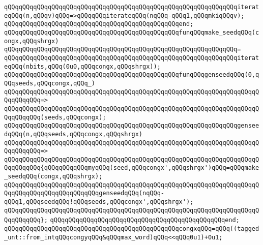 \verb|qQQqqQQqqQQqqQQqqQQqqQQqqQQqqQQqqQQqqQQqqQQqqQQqqQQqqQQqqQQqqQQqiterateqQQq(n,qQQqv)qQQq=>qQQqqQQqiterateqQQq(nqQQq-qQQq1,qQQqmkiqQQqv);|\newline
\verb|qQQqqQQqqQQqqQQqqQQqqQQqqQQqqQQqqQQqqQQqqQQqqQQqend;|\newline
\newline
\verb|qQQqqQQqqQQqqQQqqQQqqQQqqQQqqQQqqQQqqQQqqQQqqQQqfunqQQqmake_seedqQQq(congx,qQQqshrgx)|\newline
\verb|qQQqqQQqqQQqqQQqqQQqqQQqqQQqqQQqqQQqqQQqqQQqqQQqqQQqqQQqqQQqqQQq=|\newline
\verb|qQQqqQQqqQQqqQQqqQQqqQQqqQQqqQQqqQQqqQQqqQQqqQQqqQQqqQQqqQQqqQQqiterateqQQq(nbits,qQQq(0u0,qQQqcongx,qQQqshrgx));|\newline
\newline
\newline
\verb|qQQqqQQqqQQqqQQqqQQqqQQqqQQqqQQqqQQqqQQqqQQqqQQqfunqQQqgenseedqQQq(0,qQQqseeds,qQQqcongx,qQQq_)|\newline
\verb|qQQqqQQqqQQqqQQqqQQqqQQqqQQqqQQqqQQqqQQqqQQqqQQqqQQqqQQqqQQqqQQqqQQqqQQqqQQqqQQq=>|\newline
\verb|qQQqqQQqqQQqqQQqqQQqqQQqqQQqqQQqqQQqqQQqqQQqqQQqqQQqqQQqqQQqqQQqqQQqqQQqqQQqqQQq(seeds,qQQqcongx);|\newline
\newline
\verb|qQQqqQQqqQQqqQQqqQQqqQQqqQQqqQQqqQQqqQQqqQQqqQQqqQQqqQQqqQQqqQQqgenseedqQQq(n,qQQqseeds,qQQqcongx,qQQqshrgx)|\newline
\verb|qQQqqQQqqQQqqQQqqQQqqQQqqQQqqQQqqQQqqQQqqQQqqQQqqQQqqQQqqQQqqQQqqQQqqQQqqQQqqQQq=>|\newline
\verb|qQQqqQQqqQQqqQQqqQQqqQQqqQQqqQQqqQQqqQQqqQQqqQQqqQQqqQQqqQQqqQQqqQQqqQQqqQQqqQQq{qQQqqQQqqQQqmyqQQq(seed,qQQqcongx',qQQqshrgx')qQQq=qQQqmake_seedqQQq(congx,qQQqshrgx);|\newline
\verb|qQQqqQQqqQQqqQQqqQQqqQQqqQQqqQQqqQQqqQQqqQQqqQQqqQQqqQQqqQQqqQQqqQQqqQQqqQQqqQQqqQQqqQQqqQQqqQQqgenseedqQQq(nqQQq-qQQq1,qQQqseedqQQq!qQQqseeds,qQQqcongx',qQQqshrgx');|\newline
\verb|qQQqqQQqqQQqqQQqqQQqqQQqqQQqqQQqqQQqqQQqqQQqqQQqqQQqqQQqqQQqqQQqqQQqqQQqqQQqqQQq};|\newline
\verb|qQQqqQQqqQQqqQQqqQQqqQQqqQQqqQQqqQQqqQQqqQQqqQQqend;|\newline
\newline
\verb|qQQqqQQqqQQqqQQqqQQqqQQqqQQqqQQqqQQqqQQqqQQqqQQqcongxqQQq=qQQq((tagged_unt::from_intqQQqcongyqQQq&qQQqmax_word)qQQq<<qQQq0u1)+0u1;|\newline
\newline
